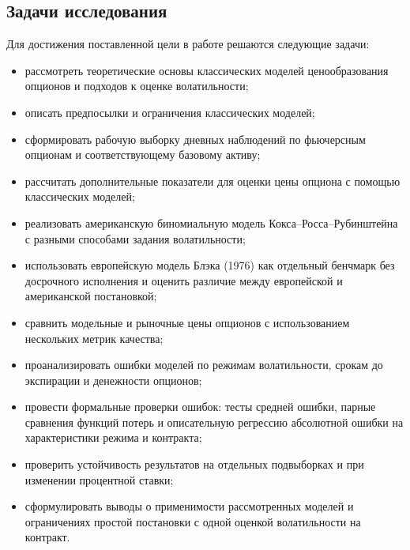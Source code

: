 \documentclass[11pt,a4paper]{article}
\begin{document}
\subsection*{Задачи исследования}

Для достижения поставленной цели в работе решаются следующие задачи:

\begin{itemize}
    \item рассмотреть теоретические основы классических моделей ценообразования опционов и подходов к оценке волатильности;

    \item описать предпосылки и ограничения классических моделей;

    \item сформировать рабочую выборку дневных наблюдений по фьючерсным опционам и соответствующему базовому активу;

    \item рассчитать дополнительные показатели для оценки цены опциона с помощью классических моделей;

    \item реализовать американскую биномиальную модель Кокса--Росса--Рубинштейна с разными способами задания волатильности;

    \item использовать европейскую модель Блэка (1976) как отдельный бенчмарк без досрочного исполнения и оценить различие между европейской и американской постановкой;

    \item сравнить модельные и рыночные цены опционов с использованием нескольких метрик качества;

    \item проанализировать ошибки моделей по режимам волатильности, срокам до экспирации и денежности опционов;

    \item провести формальные проверки ошибок: тесты средней ошибки, парные сравнения функций потерь и описательную регрессию абсолютной ошибки на характеристики режима и контракта;

    \item проверить устойчивость результатов на отдельных подвыборках и при изменении процентной ставки;

    \item сформулировать выводы о применимости рассмотренных моделей и ограничениях простой постановки с одной оценкой волатильности на контракт.
\end{itemize}
\end{document}
